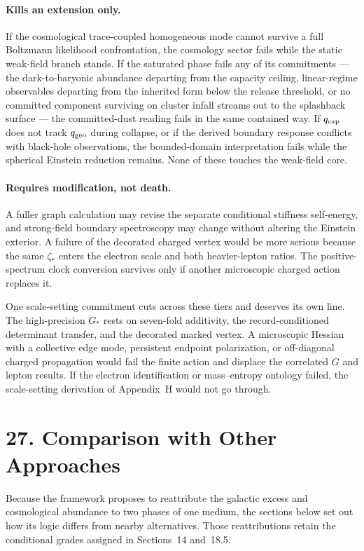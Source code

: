 \documentclass[11pt]{article}
\begin{document}
\paragraph{Kills an extension only.} If the cosmological trace-coupled homogeneous mode cannot survive a full Boltzmann likelihood confrontation, the cosmology sector fails while the static weak-field branch stands. If the saturated phase fails any of its commitments --- the dark-to-baryonic abundance departing from the capacity ceiling, linear-regime observables departing from the inherited form below the release threshold, or no committed component surviving on cluster infall streams out to the splashback surface --- the committed-dust reading fails in the same contained way. If $q_{\rm cap}$ does not track $q_{\rm geo}$ during collapse, or if the derived boundary response conflicts with black-hole observations, the bounded-domain interpretation fails while the spherical Einstein reduction remains. None of these touches the weak-field core.

\paragraph{Requires modification, not death.} A fuller graph calculation may revise the separate conditional stiffness self-energy, and strong-field boundary spectroscopy may change without altering the Einstein exterior. A failure of the decorated charged vertex would be more serious because the same $\zeta_*$ enters the electron scale and both heavier-lepton ratios. The positive-spectrum clock conversion survives only if another microscopic charged action replaces it.

One scale-setting commitment cuts across these tiers and deserves its own line. The high-precision $G_*$ rests on seven-fold additivity, the record-conditioned determinant transfer, and the decorated marked vertex. A microscopic Hessian with a collective edge mode, persistent endpoint polarization, or off-diagonal charged propagation would fail the finite action and displace the correlated $G$ and lepton results. If the electron identification or mass--entropy ontology failed, the scale-setting derivation of Appendix~H would not go through.
\section{27. Comparison with Other Approaches}

Because the framework proposes to reattribute the galactic excess and cosmological abundance to two phases of one medium, the sections below set out how its logic differs from nearby alternatives. Those reattributions retain the conditional grades assigned in Sections~14 and~18.5.
\end{document}
